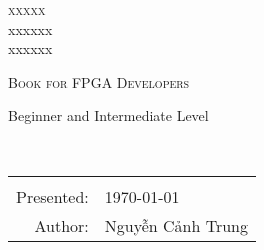 \begin{titlepage}
	\setcounter{page}{-1}
	\begin{center}
		
		\textsc{\Large xxxxx}\\[1.5ex]
		xxxxxx \\[1.5ex]
		xxxxxx \\[3ex]
		
		\vfill
		\vfill
		
		\textsc{\Huge Book for FPGA Developers}\\[4ex]
		\centerline{\Large Beginner and Intermediate Level}
		\vspace{20pt}
		
		\textsc{}\\[3ex]
		\vspace{20pt}
		
		\vfill
		\vfill
		
	 \begin{tabular}{rl}\hline\\
		Presented:                			& \quad \today \\[1.5ex]
		Author:                   			& \quad Nguyễn Cảnh Trung \\[1.5ex]
	\end{tabular}
	\end{center}
	
	\clearpage
	\pagestyle{empty}
	
\end{titlepage}